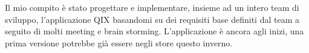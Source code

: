Il mio compito è stato progettare e implementare, insieme ad un intero team di sviluppo, 
l'applicazione QIX basandomi su dei requisiti base definiti dal team a seguito di molti meeting 
e brain storming. L'applicazione è ancora agli inizi, una prima versione potrebbe già essere
negli store questo inverno.